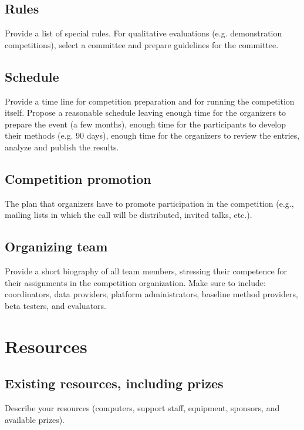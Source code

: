 \documentclass[11pt, oneside]{article}
\begin{document}
\subsection{Rules}

Provide a list of special rules. 
For qualitative evaluations (e.g. demonstration competitions), select a committee and prepare guidelines for the committee.

\subsection{Schedule}

Provide a time line for competition preparation and for running the competition itself. Propose a reasonable schedule leaving enough time for the organizers
to prepare the event (a few months), enough time for the participants to develop their methods (e.g. 90 days), enough time for the organizers to review the entries, analyze and publish the results. 


\subsection{Competition promotion}

The plan that organizers have to promote participation in the competition (e.g., mailing lists in which the call will be distributed, invited talks, etc.).


\subsection{Organizing team}

Provide a short biography of all team members, stressing their competence for their assignments in the competition organization. Make sure to include: coordinators, data providers, platform administrators, baseline method providers, beta testers, and evaluators.


\section{Resources}
\subsection{Existing resources, including prizes}

Describe your resources (computers, support staff, equipment, sponsors, and available prizes).



%

\end{document}
